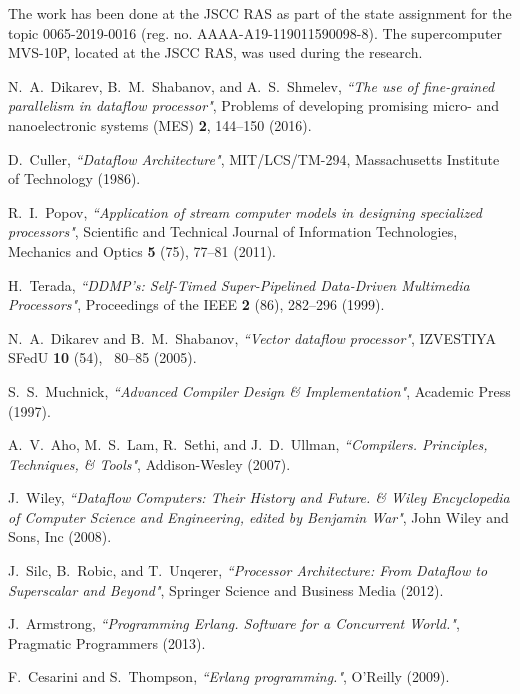 \documentclass[
11pt,%
tightenlines,%
twoside,%
onecolumn,%
nofloats,%
nobibnotes,%
nofootinbib,%
superscriptaddress,%
noshowpacs,%
centertags]%
{revtex4}
\begin{document}
\begin{acknowledgments}
The work has been done at the JSCC RAS as part of the state assignment for the topic 0065-2019-0016 (reg. no. AAAA-A19-119011590098-8).
The supercomputer MVS-10P, located at the JSCC RAS, was used during the research.
\end{acknowledgments}

\begin{thebibliography}{99}

 N.~A.~Dikarev, B.~M.~Shabanov, and A.~S.~Shmelev,
{\it ``The use of fine-grained parallelism in dataflow processor"},
Problems of developing promising micro- and nanoelectronic systems
(MES) {\bf 2}, 144--150 (2016).

D.~Culler, {\it ``Dataflow Architecture"}, MIT/LCS/TM-294, Massachusetts Institute of Technology (1986).

 R.~I.~Popov, {\it ``Application of stream computer
models in designing specialized processors"}, Scientific and
Technical Journal of Information Technologies, Mechanics and Optics
{\bf 5} (75), 77--81 (2011).

 H.~Terada, {\it ``DDMP's: Self-Timed
Super-Pipelined Data-Driven Multimedia Processors"}, Proceedings of
the IEEE {\bf 2} (86), 282--296 (1999).

 N.~A.~Dikarev and B.~M.~Shabanov, {\it ``Vector
dataflow processor"}, IZVESTIYA SFedU {\bf 10} (54), ~80--85 (2005).

 S.~S.~Muchnick, {\it ``Advanced Compiler Design \&
Implementation"}, Academic Press (1997).

 A.~V.~Aho, M.~S.~Lam, R.~Sethi, and J.~D.~Ullman,
{\it ``Compilers. Principles, Techniques, \& Tools"}, Addison-Wesley
(2007).

J.~Wiley, {\it ``Dataflow Computers: Their History and Future. \& Wiley Encyclopedia of Computer Science and Engineering, edited by Benjamin War"}, John Wiley and Sons, Inc (2008).

 J.~Silc, B.~Robic, and T.~Unqerer, {\it ``Processor
Architecture: From Dataflow to Superscalar and Beyond"}, Springer
Science and Business Media (2012).

J.~Armstrong, {\it ``Programming Erlang. Software for a Concurrent World."}, Pragmatic Programmers (2013).

 F.~Cesarini and S.~Thompson, {\it ``Erlang
programming."}, O'Reilly (2009).

\end{thebibliography}
\end{document}
